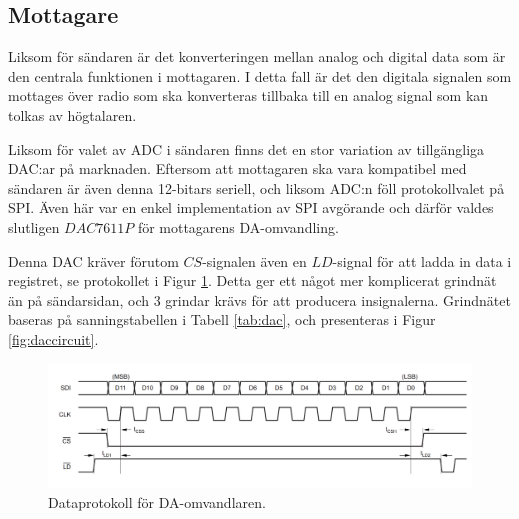 \documentclass[a4paper,10pt]{article}
\begin{document}
\subsection{Mottagare}

Liksom för sändaren är det konverteringen mellan analog och digital data som
är den centrala funktionen i mottagaren. I detta fall är det den digitala 
signalen som mottages över radio som ska konverteras tillbaka till en analog
signal som kan tolkas av högtalaren.

Liksom för valet av ADC i sändaren finns det en stor variation av tillgängliga 
DAC:ar på marknaden. Eftersom att mottagaren ska vara kompatibel med sändaren
är även denna 12-bitars seriell, och liksom ADC:n föll protokollvalet på SPI. 
Även här var en enkel implementation av SPI avgörande och därför valdes 
slutligen $DAC7611P$ \cite{dac} för mottagarens DA-omvandling. 

Denna DAC kräver förutom $CS$-signalen även en $LD$-signal för att ladda in data
i registret, se protokollet i Figur \ref{fig:dacprotocol}. Detta ger ett något 
mer komplicerat grindnät än på sändarsidan, och 3 grindar krävs för att 
producera insignalerna. Grindnätet baseras på sanningstabellen i Tabell 
\ref{tab:dac}, och presenteras i Figur 
\ref{fig:daccircuit}.

\begin{figure}
\centering
\includegraphics[width=\textwidth]{dacdiagram.png}
\caption{Dataprotokoll för DA-omvandlaren.}
\label{fig:dacprotocol}
\end{figure}
\end{document}

